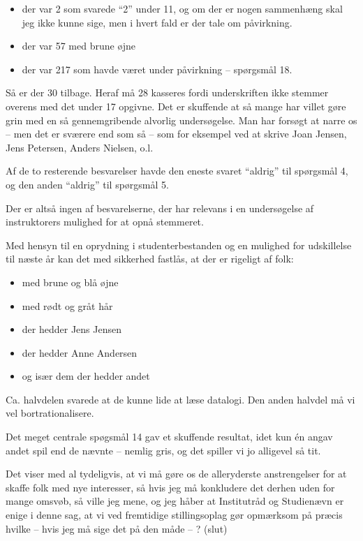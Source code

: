 \documentclass[a4paper,11pt]{article}
\begin{document}
\begin{sketch}
\begin{itemize}
\item der var 2 som svarede "`2"' under 11, og om der er nogen
  sammenhæng skal jeg ikke kunne sige, men i hvert fald er der tale om
  påvirkning.

\item der var 57 med brune øjne

\item der var 217 som havde været under påvirkning -- spørgsmål 18.

\end{itemize}

Så er der 30 tilbage.  Heraf må 28 kasseres fordi underskriften ikke
stemmer overens med det under 17 opgivne.  Det er skuffende at så
mange har villet gøre grin med en så gennemgribende alvorlig
undersøgelse.  Man har forsøgt at narre os -- men det er sværere end
som så -- som for eksempel ved at skrive Joan Jensen, Jens Petersen,
Anders Nielsen, o.l.

Af de to resterende besvarelser havde den eneste svaret "`aldrig"' til spørgsmål 4, og den anden "`aldrig"' til spørgsmål 5.

Der er altså ingen af besvarelserne, der har relevans i en
undersøgelse af instruktorers mulighed for at opnå stemmeret.

Med hensyn til en oprydning i studenterbestanden og en mulighed for
udskillelse til næste år kan det med sikkerhed fastlås, at der er
rigeligt af folk:

\begin{itemize}
\item med brune og blå øjne
\item med rødt og gråt hår
\item der hedder Jens Jensen
\item der hedder Anne Andersen
\item og især dem der hedder andet
\end{itemize}

Ca. halvdelen svarede at de kunne lide at læse datalogi.  Den anden
halvdel må vi vel bortrationalisere.

Det meget centrale spøgsmål 14 gav et skuffende resultat, idet kun én
angav andet spil end de nævnte -- nemlig gris, og det spiller vi jo
alligevel så tit.

Det viser med al tydeligvis, at vi må gøre os de alleryderste
anstrengelser for at skaffe folk med nye interesser, så hvis jeg må
konkludere det derhen uden for mange omsvøb, så ville jeg mene, og jeg
håber at Institutråd og Studienævn er enige i denne sag, at vi ved
fremtidige stillingsoplag gør opmærksom på præcis hvilke -- hvis jeg
må sige det på den måde -- ? (slut)

\end{sketch}
\end{document}
